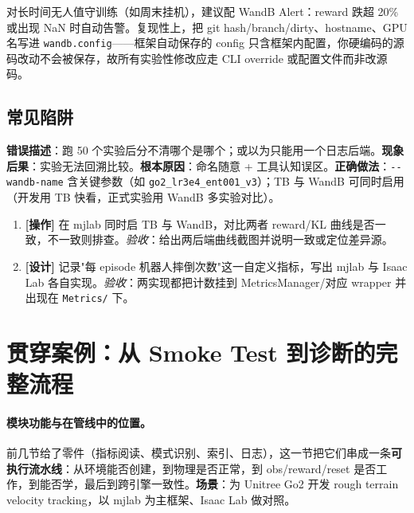 对长时间无人值守训练（如周末挂机），建议配 WandB Alert：reward 跌超 20\% 或出现 NaN 时自动告警。复现性上，把 git hash/branch/dirty、hostname、GPU 名写进 \verb|wandb.config|——框架自动保存的 config 只含框架内配置，你硬编码的源码改动不会被保存，故所有实验性修改应走 CLI override 或配置文件而非改源码。

\subsection{常见陷阱}

\begin{pitfall}
\textbf{错误描述}：跑 50 个实验后分不清哪个是哪个；或以为只能用一个日志后端。\textbf{现象后果}：实验无法回溯比较。\textbf{根本原因}：命名随意 + 工具认知误区。\textbf{正确做法}：\verb|--wandb-name| 含关键参数（如 \verb|go2_lr3e4_ent001_v3|）；TB 与 WandB 可同时启用（开发用 TB 快看，正式实验用 WandB 多实验对比）。
\end{pitfall}

\begin{practice}[本节动手任务]
\begin{enumerate}
  \item \textbf{[操作]} 在 mjlab 同时启 TB 与 WandB，对比两者 reward/KL 曲线是否一致，不一致则排查。\emph{验收}：给出两后端曲线截图并说明一致或定位差异源。
  \item \textbf{[设计]} 记录"每 episode 机器人摔倒次数"这一自定义指标，写出 mjlab 与 Isaac Lab 各自实现。\emph{验收}：两实现都把计数挂到 MetricsManager/对应 wrapper 并出现在 \verb|Metrics/| 下。
\end{enumerate}
\end{practice}

\section{贯穿案例：从 Smoke Test 到诊断的完整流程}
\label{sec:rlmc-diag-walkthrough}

\paragraph{模块功能与在管线中的位置。}前几节给了零件（指标阅读、模式识别、索引、日志），这一节把它们串成一条\textbf{可执行流水线}：从环境能否创建，到物理是否正常，到 obs/reward/reset 是否工作，到能否学，最后到跨引擎一致性。\textbf{场景}：为 Unitree Go2 开发 rough terrain velocity tracking，以 mjlab 为主框架、Isaac Lab 做对照。

